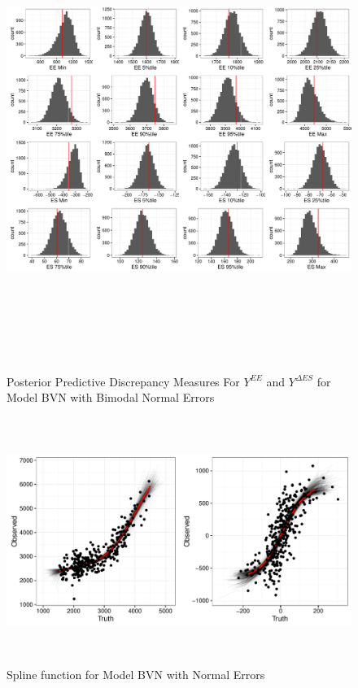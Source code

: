 \documentclass[11pt]{article}\usepackage[]{graphicx}\usepackage[]{color}
\begin{document}
  \begin{figure}
  \centering
  \includegraphics[width=17cm,height=15cm]{manual_figure/wpydiagbvnb.pdf}
  \caption{Posterior Predictive Discrepancy Measures For $Y^{EE}$ and $Y^{\Delta ES}$ for Model BVN with Bimodal Normal Errors}
  \label{wpydiagbvnb}
  \end{figure}



  \begin{figure}
  \centering
  \includegraphics[width=17cm,height=8cm]{manual_figure/predbvnx.pdf}
  \caption{Spline function for Model BVN with Normal Errors}
  \label{predbvnx}
  \end{figure}
\end{document}
